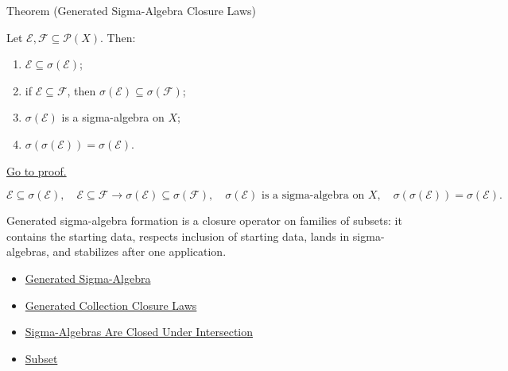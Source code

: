 \begin{theorembox}{Theorem (Generated Sigma-Algebra Closure Laws)}
\begin{theorem}\label{thm:generated-sigma-algebra-closure-laws}
Let \(\mathcal E,\mathcal F\subseteq\mathcal P(X)\).  Then:
\begin{enumerate}[label=(\roman*)]
\item \(\mathcal E\subseteq\sigma(\mathcal E)\);
\item if \(\mathcal E\subseteq\mathcal F\), then
      \(\sigma(\mathcal E)\subseteq\sigma(\mathcal F)\);
\item \(\sigma(\mathcal E)\) is a sigma-algebra on \(X\);
\item \(\sigma(\sigma(\mathcal E))=\sigma(\mathcal E)\).
\end{enumerate}
\hyperref[prf:generated-sigma-algebra-closure-laws]{Go to proof.}
\end{theorem}
\end{theorembox}

\begin{remark*}
\[
\mathcal E\subseteq\sigma(\mathcal E),\quad
\mathcal E\subseteq\mathcal F\to\sigma(\mathcal E)\subseteq\sigma(\mathcal F),\quad
\sigma(\mathcal E)\text{ is a sigma-algebra on }X,\quad
\sigma(\sigma(\mathcal E))=\sigma(\mathcal E).
\]
\end{remark*}

\begin{remark*}[Interpretation]
Generated sigma-algebra formation is a closure operator on families of subsets:
it contains the starting data, respects inclusion of starting data, lands in
sigma-algebras, and stabilizes after one application.
\end{remark*}


\begin{dependencies}
\begin{itemize}
  \item \hyperref[def:generated-sigma-algebra]{Generated Sigma-Algebra}
  \item \hyperref[thm:generated-collection-closure-laws]{Generated Collection Closure Laws}
  \item \hyperref[thm:sigma-algebras-closed-under-intersection]{Sigma-Algebras Are Closed Under Intersection}
  \item \hyperref[def:subset]{Subset}
\end{itemize}
\end{dependencies}
